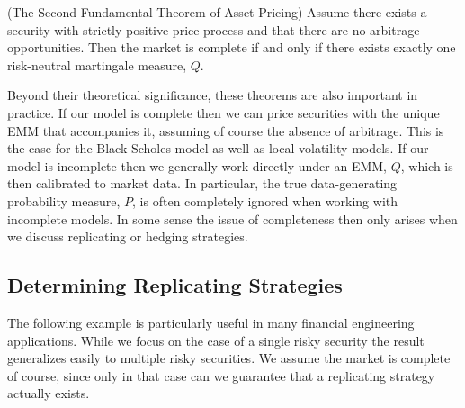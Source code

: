 \begin{theorem} (The Second Fundamental Theorem of Asset Pricing)
Assume there exists a security with strictly positive price process and that there are no arbitrage opportunities. Then the market is complete if and only if there exists exactly one risk-neutral martingale measure, $Q$.
\end{theorem}

Beyond their theoretical significance, these theorems are also important in practice. If our model is complete then we can price securities with the unique EMM that accompanies it, assuming of course the absence of arbitrage. This is the case for the Black-Scholes model as well as local volatility models. If our model is incomplete then we generally work directly under an EMM, $Q$, which is then calibrated to market data. In particular, the true data-generating probability measure, $P$, is often completely ignored when working with incomplete models. In some sense the issue of completeness then only arises when we discuss replicating or hedging strategies.

\subsection{Determining Replicating Strategies}
The following example is particularly useful in many financial engineering applications. While we focus on the case of a single risky security the result generalizes easily to multiple risky securities. We assume the market is complete of course, since only in that case can we guarantee that a replicating strategy actually exists.

